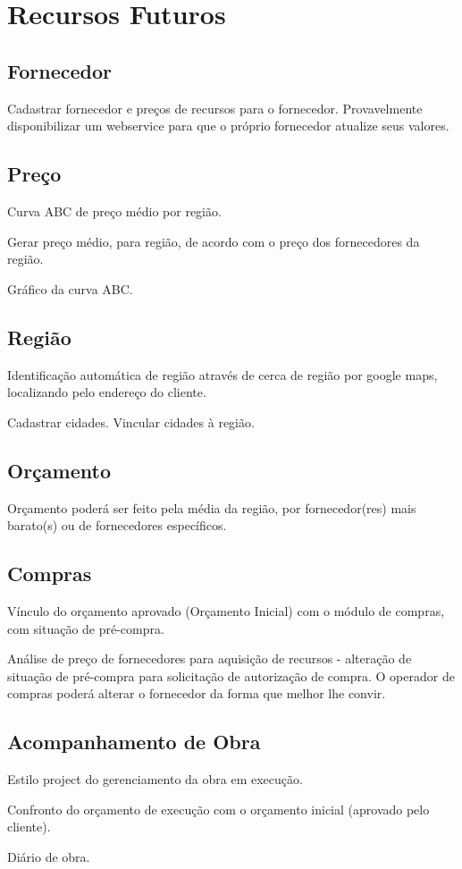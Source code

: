 \chapter{Recursos Futuros}

\section{Fornecedor}

Cadastrar fornecedor e preços de recursos para o fornecedor. Provavelmente disponibilizar um webservice para que o próprio fornecedor atualize seus valores.

\section{Preço}

Curva ABC de preço médio por região.

Gerar preço médio, para região, de acordo com o preço dos fornecedores da região.

Gráfico da curva ABC.

\section{Região}

Identificação automática de região através de cerca de região por google maps, localizando pelo endereço do cliente.

Cadastrar cidades. Vincular cidades à região.

\section{Orçamento}

Orçamento poderá ser feito pela média da região, por fornecedor(res) mais barato(s) ou de fornecedores específicos.

\section{Compras}

Vínculo do orçamento aprovado (Orçamento Inicial) com o módulo de compras, com situação de pré-compra.

Análise de preço de fornecedores para aquisição de recursos - alteração de situação de pré-compra para solicitação de autorização de compra. O operador de compras poderá alterar o fornecedor da forma que melhor lhe convir.

\section{Acompanhamento de Obra}

Estilo project do gerenciamento da obra em execução.

Confronto do orçamento de execução com o orçamento inicial (aprovado pelo cliente).

Diário de obra.



